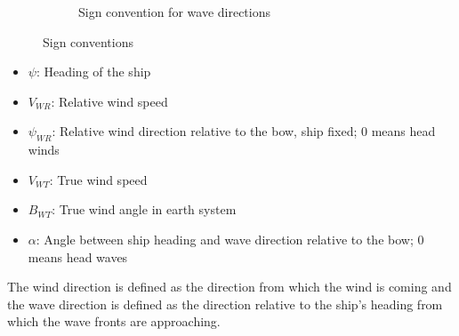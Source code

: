 \begin{figure}[H]
\begin{subfigure}[c]{0.45\textwidth}
        \caption{Sign convention for wave directions}
        \label{wave directions}
    \end{subfigure}
    \caption{Sign conventions}
    \label{directions}
\end{figure}
\begin{itemize}
    \item $\psi$: Heading of the ship
    \item $V_{WR}$: Relative wind speed
    \item $\psi_{WR}$: Relative wind direction relative to the bow, ship fixed; 0 means head winds
    \item $V_{WT}$: True wind speed
    \item $B_{WT}$: True wind angle in earth system
    \item $\alpha$: Angle between ship heading and wave direction relative to the bow; 0 means head waves
\end{itemize}
The wind direction is defined as the direction from which the wind is coming and the wave direction is defined as the direction relative to the ship's heading from which the wave fronts are approaching.

